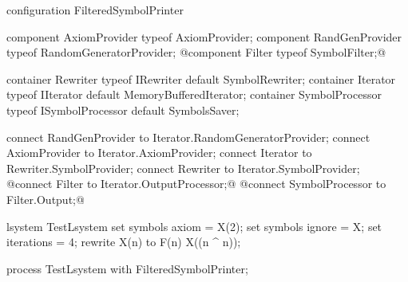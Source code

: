 \begin{Lsystem}[label=lsys:lastFilter,caption={Test of extended \emph{SymbolPrinter} process configuration with created filter component}]
configuration FilteredSymbolPrinter {
	component AxiomProvider typeof AxiomProvider;
	component RandGenProvider typeof RandomGeneratorProvider;
	@component Filter typeof SymbolFilter;@

	container Rewriter typeof IRewriter default SymbolRewriter;
	container Iterator typeof IIterator
		default MemoryBufferedIterator;
	container SymbolProcessor typeof ISymbolProcessor
		default SymbolsSaver;

	connect RandGenProvider to Iterator.RandomGeneratorProvider;
	connect AxiomProvider to Iterator.AxiomProvider;
	connect Iterator to Rewriter.SymbolProvider;
	connect Rewriter to Iterator.SymbolProvider;
	@connect Filter to Iterator.OutputProcessor;@
	@connect SymbolProcessor to Filter.Output;@
}

lsystem TestLsystem {
	set symbols axiom = X(2);
	set symbols ignore = X;
	set iterations = 4;
	rewrite X(n) to F(n) X((n ^ n));
}

process TestLsystem with FilteredSymbolPrinter;
\end{Lsystem}













